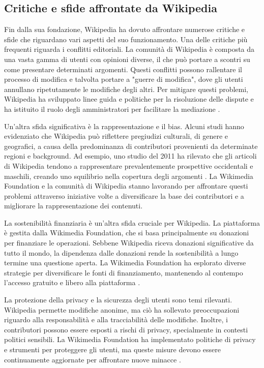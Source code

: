 \documentclass[12pt,a4paper]{report}
\begin{document}
\subsection{Critiche e sfide affrontate da Wikipedia}

Fin dalla sua fondazione, Wikipedia ha dovuto affrontare numerose critiche e sfide che riguardano vari aspetti del suo funzionamento. Una delle critiche più frequenti riguarda i conflitti editoriali. La comunità di Wikipedia è composta da una vasta gamma di utenti con opinioni diverse, il che può portare a scontri su come presentare determinati argomenti. Questi conflitti possono rallentare il processo di modifica e talvolta portare a "guerre di modifica", dove gli utenti annullano ripetutamente le modifiche degli altri. Per mitigare questi problemi, Wikipedia ha sviluppato linee guida e politiche per la risoluzione delle dispute e ha istituito il ruolo degli amministratori per facilitare la mediazione \cite{reagle2010good}.

Un'altra sfida significativa è la rappresentazione e il bias. Alcuni studi hanno evidenziato che Wikipedia può riflettere pregiudizi culturali, di genere e geografici, a causa della predominanza di contributori provenienti da determinate regioni e background. Ad esempio, uno studio del 2011 ha rilevato che gli articoli di Wikipedia tendono a rappresentare prevalentemente prospettive occidentali e maschili, creando uno squilibrio nella copertura degli argomenti \cite{lam2011wp}. La Wikimedia Foundation e la comunità di Wikipedia stanno lavorando per affrontare questi problemi attraverso iniziative volte a diversificare la base dei contributori e a migliorare la rappresentazione dei contenuti.

La sostenibilità finanziaria è un'altra sfida cruciale per Wikipedia. La piattaforma è gestita dalla Wikimedia Foundation, che si basa principalmente su donazioni per finanziare le operazioni. Sebbene Wikipedia riceva donazioni significative da tutto il mondo, la dipendenza dalle donazioni rende la sostenibilità a lungo termine una questione aperta. La Wikimedia Foundation ha esplorato diverse strategie per diversificare le fonti di finanziamento, mantenendo al contempo l'accesso gratuito e libero alla piattaforma \cite{history_of_wikis}.

La protezione della privacy e la sicurezza degli utenti sono temi rilevanti. Wikipedia permette modifiche anonime, ma ciò ha sollevato preoccupazioni riguardo alla responsabilità e alla tracciabilità delle modifiche. Inoltre, i contributori possono essere esposti a rischi di privacy, specialmente in contesti politici sensibili. La Wikimedia Foundation ha implementato politiche di privacy e strumenti per proteggere gli utenti, ma queste misure devono essere continuamente aggiornate per affrontare nuove minacce \cite{denning2005wikipedia}.
\end{document}
